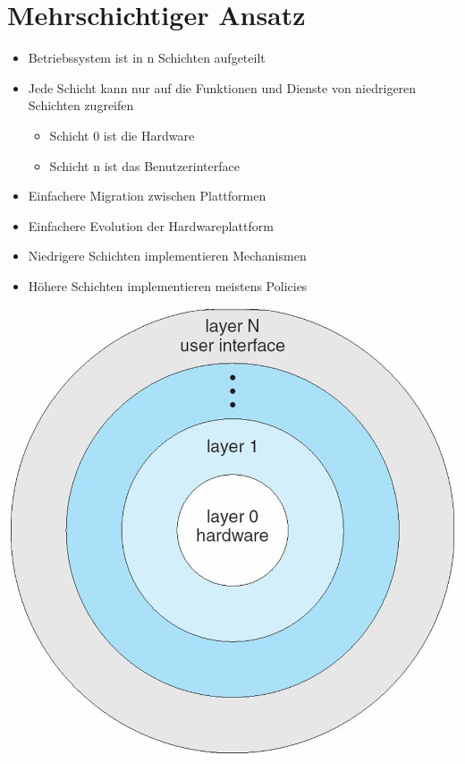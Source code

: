 \documentclass[a4paper]{scrreprt}
\begin{document}
\section{Mehrschichtiger Ansatz}
	\begin{itemize}
		\item Betriebssystem ist in n Schichten aufgeteilt
		\item Jede Schicht kann nur auf die Funktionen und Dienste von niedrigeren Schichten zugreifen 
			\begin{itemize} 
				\item Schicht 0 ist die Hardware
				\item Schicht n ist das Benutzerinterface
			\end{itemize}
		\item Einfachere Migration zwischen Plattformen
		\item Einfachere Evolution der Hardwareplattform
		\item Niedrigere Schichten implementieren Mechanismen
		\item Höhere Schichten implementieren meistens Policies
	\end{itemize}

\begin{center}
\includegraphics[scale=0.25]{graphics/schichtenmodell.png}
\end{center}
\end{document}
